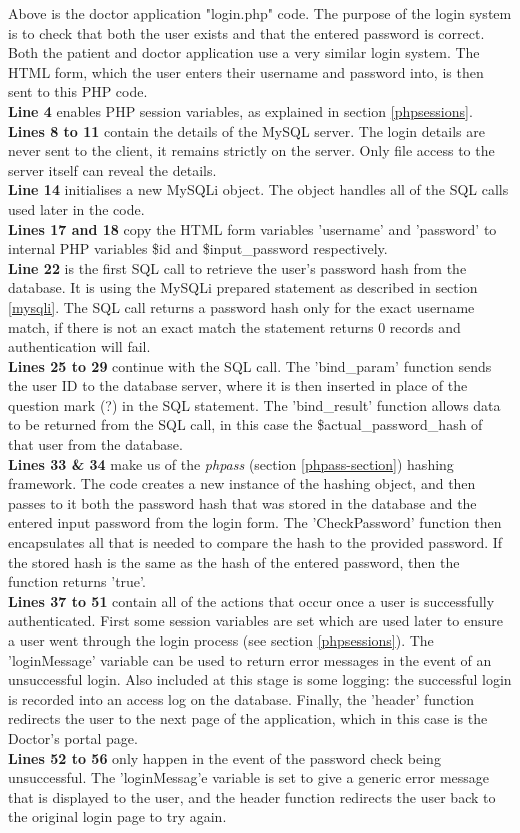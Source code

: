 \documentclass[11pt]{article}
\begin{document}
Above is the doctor application "login.php" code. The purpose of the login system is to check that both the user exists and that the entered password is correct. Both the patient and doctor application use a very similar login system. The HTML form, which the user enters their username and password into, is then sent to this PHP code.
\\
\textbf{Line 4} enables PHP session variables, as explained in section \ref{phpsessions}.
\\
\textbf{Lines 8 to 11} contain the details of the MySQL server. The login details are never sent to the client, it remains strictly on the server. Only file access to the server itself can reveal the details. 
\\
\textbf{Line 14} initialises a new MySQLi object. The object handles all of the SQL calls used later in the code.
\\
\textbf{Lines 17 and 18} copy the HTML form variables 'username' and 'password' to internal PHP variables \$id and \$input\_password respectively.
\\
\textbf{Line 22} is the first SQL call to retrieve the user's password hash from the database. It is using the MySQLi prepared statement as described in section \ref{mysqli}. The SQL call returns a password hash only for the exact username match, if there is not an exact match the statement returns 0 records and authentication will fail.
\\
\textbf{Lines 25 to 29} continue with the SQL call. The 'bind\_param' function sends the user ID to the database server, where it is then inserted in place of the question mark (?) in the SQL statement. The 'bind\_result' function allows data to be returned from the SQL call, in this case the \$actual\_password\_hash of that user from the database. 
\\
\textbf{Lines 33 \& 34} make us of the \textit{phpass} (section \ref{phpass-section}) hashing framework. The code creates a new instance of the hashing object, and then passes to it both the password hash that was stored in the database and the entered input password from the login form. The 'CheckPassword' function then encapsulates all that is needed to compare the hash to the provided password. If the stored hash is the same as the hash of the entered password, then the function returns 'true'.
\\
\textbf{Lines 37 to 51} contain all of the actions that occur once a user is successfully authenticated. First some session variables are set which are used later to ensure a user went through the login process (see section \ref{phpsessions}). The 'loginMessage' variable can be used to return error messages in the event of an unsuccessful login. Also included at this stage is some logging: the successful login is recorded into an access log on the database. Finally, the 'header' function redirects the user to the next page of the application, which in this case is the Doctor's portal page.
\\
\textbf{Lines 52 to 56} only happen in the event of the password check being unsuccessful. The 'loginMessag'e variable is set to give a generic error message that is displayed to the user, and the header function redirects the user back to the original login page to try again. 
\end{document}
